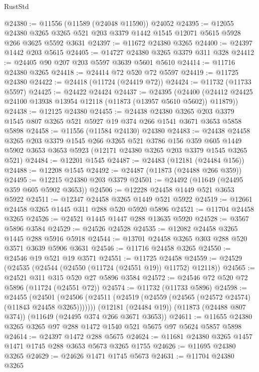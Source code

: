 \begin{lexlean}{RustStd}
\begin{coremodule}
@24380 := @11556 (@11589 (@24048 @11590)) @24052
@24395 := @12055
    @24380
    @3265
    @3265
    @521
    @203
    @3379
    @1442
    @1545
    @12071
    @5615
    @5928
    @266
    @3625
    @5592
    @3631
@24397 := @11672 @24380 @3265
@24400 := @24397 @1442 @203 @5615
@24405 := @14727 @24380 @3265 @3379 @311 @328
@24412 := @24405 @90 @207 @203 @5597 @3639 @5601 @5610
@24414 := @11716 @24380 @3265
@24418 := @24414 @72 @520 @72 @5597
@24419 := @11725 @24380
@24422 := @24418 (@11724 (@24419 @72))
@24424 := @11732 (@11733 @5597)
@24425 := @24422 @24424
@24437 := @24395
    (@24400 (@24412 @24425 @24100 @13938 @13954 @12118 (@11873 (@13957 @5610 @5602)) @11879))
@24438 := @12125 @24380
@24455 := @24438
    @24380
    @3265
    @203
    @3379
    @1545
    @807
    @3265
    @521
    @5927
    @19
    @374
    @266
    @1541
    @3671
    @3653
    @5858
    @5898
@24458 := @11556 (@11584 @24130) @24380
@24483 := @24438
    @24458
    @3265
    @203
    @3379
    @1545
    @266
    @3265
    @521
    @3786
    @156
    @359
    @605
    @1449
    @5902
    @3653
    @3653
    @5923
    (@12171 @24380 @3265 @203 @3379 @1545 @3265 @521)
@24484 := @12201 @1545
@24487 := @24483 (@12181 (@24484 @156))
@24488 := @12208 @1545
@24492 := @24487 (@11873 (@24488 @266 @359))
@24495 := @12215 @24380 @203 @3379
@24501 := @24492 (@11649 (@24495 @359 @605 @5902 @3653))
@24506 := @12228 @24458 @1449 @521 @3653 @5922
@24511 := @12347 @24458 @3265 @1449 @521 @5922
@24519 := @12661 @24458 @3265 @1445 @311 @288 @520 @5920 @5896
@24521 := @11704 @24458 @3265
@24526 := @24521 @1445 @1447 @288 @13635 @5920
@24528 := @3567 @5896 @3584
@24529 := @24526 @24528
@24535 := @12082 @24458 @3265 @1445 @288 @5916 @5918
@24544 := @13701 @24458 @3265 @303 @288 @520 @3571 @3639 @5906 @3631
@24546 := @11716 @24458 @3265
@24550 := @24546 @19 @521 @19 @3571
@24551 := @11725 @24458
@24559 := @24529 (@24535 (@24544 (@24550 (@11724 (@24551 @19)) @11752) @12118))
@24565 := @24521 @311 @315 @520 @27 @5896 @3584
@24572 := @24546 @72 @520 @72 @5896 (@11724 (@24551 @72))
@24574 := @11732 (@11733 @5896)
@24598 := @24455
    (@24501 (@24506 (@24511 (@24519 (@24559 (@24565 (@24572 @24574) (@11843 @24458 @3265)))))))
    (@12181 (@24484 @19))
    (@11873 (@24488 @807 @374))
    (@11649 (@24495 @374 @266 @3671 @3653))
@24611 := @11655 @24380 @3265 @3265 @97 @288 @1472 @1540 @521 @5675 @97 @5624 @5857 @5898
@24614 := @24397 @1472 @288 @5675
@24624 := @11681 @24380 @3265 @1457 @1471 @1745 @288 @3653 @5673 @3265 @1755
@24626 := @11695 @24380 @3265
@24629 := @24626 @1471 @1745 @5673
@24631 := @11704 @24380 @3265

\end{coremodule}
\end{lexlean}

